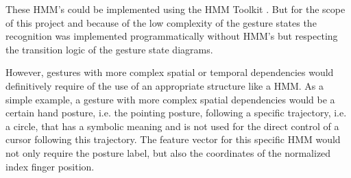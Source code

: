 These HMM's could be implemented using the HMM Toolkit \cite{htk}. But for the scope of this project and because of the low complexity of the gesture states the recognition was implemented programmatically without HMM's but respecting the transition logic of the gesture state diagrams.

However, gestures with more complex spatial or temporal dependencies would definitively require of the use of an appropriate structure like a HMM. As a simple example, a gesture with more complex spatial dependencies would be a certain hand posture, i.e. the pointing posture, following a specific trajectory, i.e. a circle, that has a symbolic meaning and is not used for the direct control of a cursor following this trajectory. The feature vector for this specific HMM would not only require the posture label, but also the coordinates of the normalized index finger position.

